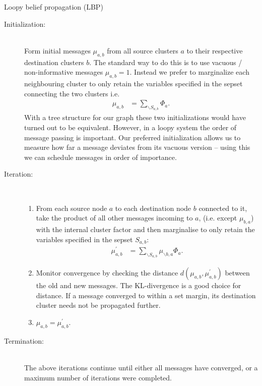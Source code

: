 \documentclass[oneside,english]{scrbook}
\begin{document}
\begin{algorithm}[h]
  \caption{Loopy belief propagation (LBP)}  \label{alg:LBP}
  \begin{description}
  \item[Initialization:] ~\\Form initial messages $\mu_{a,b}$ from all
    source clusters $a$ to their respective destination clusters
    $b$. The standard way to do this is to use vacuous /
    non-informative messages $\mu_{a,b}=1$.  Instead we prefer to
    marginalize each neighbouring cluster to only retain the variables
    specified in the sepset connecting the two clusters i.e.
    \begin{align}
      \mu_{a,b} &= \sum_{\backslash S_{a,b}} \Phi_a. \label{eq:msginit}
    \end{align}
    With a tree structure for our graph these two initializations
    would have turned out to be equivalent. However, in a loopy system
    the order of message passing is important. Our preferred
    initialization allows us to measure how far a message deviates
    from its vacuous version -- using this we can schedule messages in
    order of importance.
  \item[Iteration:]~\\[-2ex]
    \begin{enumerate}
    \item From each source node $a$ to each destination node $b$
      connected to it, take the product of all other messages incoming
      to $a$, (i.e. except $\mu_{b,a}$) with the internal cluster
      factor and then marginalise to only retain the variables
      specified in the sepset $S_{a,b}$:
      \begin{align}
        \mu^{'}_{a,b} &= \sum_{\backslash S_{a,b}} \mu_{\backslash b,a}\Phi_a. \label{eq:msgupdate}
      \end{align}
    \item Monitor convergence by checking the distance
      $d(\mu_{a,b},\mu^{'}_{a,b})$ between the old and new messages. The
      KL-divergence is a good choice for distance. If a message
      converged to within a set margin, its destination cluster needs
      not be propagated further.
    \item $\mu_{a,b} = \mu^{'}_{a,b}.$
    \end{enumerate}
  \item[Termination:]~\\ The above iterations continue until either all
    messages have converged, or a maximum number of iterations were
    completed.
  \end{description}
\end{algorithm}
\FloatBarrier
\end{document}
